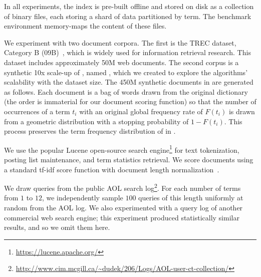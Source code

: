 In all experiments, the index is pre-built offline and stored on disk as a collection of binary files, 
each storing a shard of data partitioned by term.  The benchmark environment memory-maps the content 
of these files.  

We  experiment with two document corpora. The first  is the TREC {\cw\/} dataset, 
Category B ({\cw}09B)~\cite{ClueWeb09}, which is widely used for information retrieval research. This dataset includes approximately 50M web documents. 
The second corpus is a synthetic 10x scale-up of \cw, named \cwten, which we created to explore the algorithms' scalability 
with the dataset size. 
The 450M synthetic documents in {\cwten\/} are generated as follows. Each document is a bag of words drawn from the original {\cw\/} dictionary 
(the order is immaterial for our document scoring function) 
so that the number of occurrences of a term $t_i$ with an original 
global frequency rate of $F(t_i)$ is drawn from a geometric distribution with a stopping probability of $1-F(t_i)$. This  process preserves 
the  term frequency distribution of {\cw\/} in \cwten.
 
We use the popular Lucene open-source search engine\footnote{\small{\url{https://lucene.apache.org/}}} for text tokenization, posting list maintenance, 
and term statistics retrieval.
We score documents using 
a standard tf-idf score function with document length normalization~\cite{Baeza-Yates:1999:MIR:553876}. 

We draw queries from the public AOL search log\footnote{\small{\url{http://www.cim.mcgill.ca/~dudek/206/Logs/AOL-user-ct-collection/}}}.
For each number of terms from $1$ to $12$, we independently sample $100$ queries of this length uniformly at random from the AOL log.
We also  experimented with a query log of another commercial web search engine; this experiment  
produced statistically similar results, and so we omit them here.  


